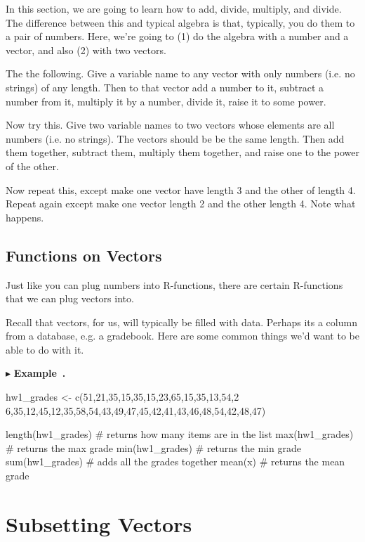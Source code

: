 \documentclass[11pt]{amsart}
\renewcommand{\(}{\left(}
\renewcommand{\)}{\right)}
\newcounter{CounterEnvironment}
\newenvironment{example}{%
	\refstepcounter{CounterEnvironment}
	\vspace{2em}
	$\blacktriangleright$
	\textbf{Example~\theCounterEnvironment.}
}%
{%
	\vspace{2em}
}
\begin{document}
In this section, we are going to learn how to add, divide, multiply, and divide. The difference between this and typical algebra is that, typically, you do them to a pair of numbers.  Here, we're going to (1) do the algebra with a number and a vector, and also (2) with two vectors.
  
The the following. Give a variable name to any vector with only
numbers (i.e. no strings) of any length.  Then to that vector add a
number to it, subtract a number from it, multiply it by a number,
divide it, raise it to some power.


Now try this. Give two variable names to two vectors whose elements
are all numbers (i.e. no strings). The vectors should be be the same
length. Then add them together, subtract them, multiply them together,
and raise one to the power of the other.

Now repeat this, except make one vector have length 3 and the other of
length 4. Repeat again except make one vector length 2 and the other
length 4.  Note what happens.

\subsection{Functions on Vectors}

Just like you can plug numbers into R-functions, there are certain
R-functions that we can plug vectors into.
  
Recall that vectors, for us, will typically be filled with data. Perhaps its a column from a database, e.g. a gradebook. Here are some common things we'd want to be able to do with it.
  
\begin{example}
  \begin{rcode}
    hw1_grades <-  c(51,21,35,15,35,15,23,65,15,35,13,54,2
    6,35,12,45,12,35,58,54,43,49,47,45,42,41,43,46,48,54,42,48,47)
    
    length(hw1_grades) # returns how many items are in the list
    max(hw1_grades) # returns the max grade
    min(hw1_grades) # returns the min grade
    sum(hw1_grades) # adds all the grades together
    mean(x) # returns the mean grade
  \end{rcode}
\end{example}
  
\section{Subsetting Vectors}
\end{document}
